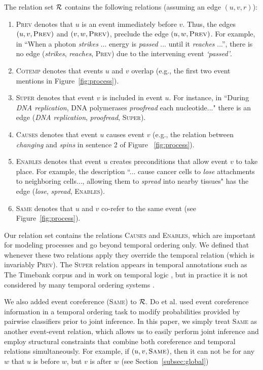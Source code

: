 The relation set $\mathcal{R}$ contains the following relations (assuming an edge $(u,v,r)$):
\begin{enumerate}[itemsep=0pt,topsep=0pt] 
\item \textsc{Prev} denotes that $u$ is an event immediately before $v$. Thus, the edges $(u,v,\mbox{\textsc{Prev}})$ and $(v,w,\mbox{\textsc{Prev}})$, preclude the edge $(u,w,\mbox{\textsc{Prev}})$. For example, in ``When a photon \emph{strikes} ... energy is  \emph{passed} ... until it \emph{reaches} ...'', there is no edge (\emph{strikes}, \emph{reaches}, \textsc{Prev}) due to the intervening event \emph{`passed'}.
\item \textsc{Cotemp} denotes that events $u$ and $v$ overlap (e.g., the first two event mentions in Figure~\ref{fig:process}).
\item \textsc{Super} denotes that event $v$ is included in event $u$. For instance, in ``During \emph{DNA replication}, DNA polymerases \emph{proofread} each nucleotide..." there is an edge (\emph{DNA replication}, \emph{proofread}, \textsc{Super}).
\item \textsc{Causes} denotes that event $u$ causes event $v$ (e.g., the relation between \emph{changing} and \emph{spins} in sentence 2 of Figure ~\ref{fig:process}).
\item \textsc{Enables} denotes that event $u$ creates preconditions that allow event $v$ to take place. For example, the description ``... cause cancer cells  to \emph{lose} attachments to neighboring cells..., allowing them to \emph{spread} into nearby tissues" has the edge (\emph{lose}, \emph{spread}, \textsc{Enables}).
\item \textsc{Same} denotes that $u$ and $v$ co-refer to the same event (see Figure~\ref{fig:process}).
\end{enumerate}

Our relation set contains the relations \textsc{Causes} and \textsc{Enables}, which are important for modeling processes and go beyond temporal ordering only. We defined that whenever these two relations apply they override the temporal relation (which is invariably \textsc{Prev}). The \textsc{Super} relation appears in temporal annotations such as The Timebank corpus \cite{Pustejovsky03} and in work on temporal logic \cite{Allen83}, but in practice it is not considered by many temporal ordering systems \cite{Chambers08,Yoshikawa09,Do12}. 

We also added event coreference (\textsc{Same}) to $\mathcal{R}$. Do et al.  used event coreference information in a temporal ordering task to modify probabilities provided by pairwise classifiers prior to joint inference. In this paper, we simply treat \textsc{Same} as another event-event relation, which allows us to easily perform joint inference and employ structural constraints that combine both coreference and temporal relations simultaneously. For example, if $(u,v,\mbox{\textsc{Same}})$, then it can not be for any $w$ that $u$ is before $w$, but $v$ is after $w$ (see Section~\ref{subsec:global})

